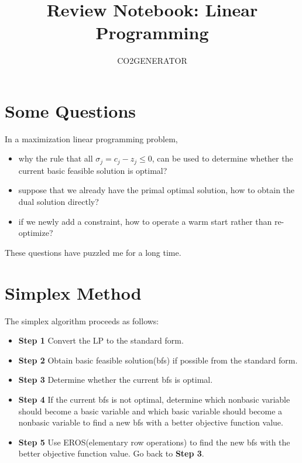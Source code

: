 \documentclass{article}
\title {Review Notebook: Linear Programming}
\author{CO2GENERATOR}
\begin{document}
\maketitle 
\allowdisplaybreaks[4]

 

\section{Some Questions}

In a maximization linear programming problem, 

\begin{itemize}
	\item why the rule that all $\sigma_j = c_j - z_j \leq 0$, can be used to determine whether the current basic feasible solution is optimal?
	\item suppose that we already have the primal optimal solution, how to obtain the dual solution directly? 
	\item if we newly add a constraint, how to operate a warm start rather than re-optimize? 
\end{itemize}

These questions have puzzled me for a long time.

\newpage
\section{Simplex Method}

The simplex algorithm proceeds as follows:

\begin{itemize}
	\item \textbf{Step 1} Convert the LP to the standard form.
	\item \textbf{Step 2} Obtain basic feasible solution(bfs) if possible from the standard form.
	\item \textbf{Step 3} Determine whether the current bfs is optimal.
	\item \textbf{Step 4} If the current bfs is not optimal, determine which nonbasic variable should become a basic variable and which basic variable should become a nonbasic variable to find a new bfs with a better objective function value.
	\item \textbf{Step 5} Use EROS(elementary row operations) to find the new bfs with the better objective function value. Go back to \textbf{Step 3}.
\end{itemize}
\end{document}
